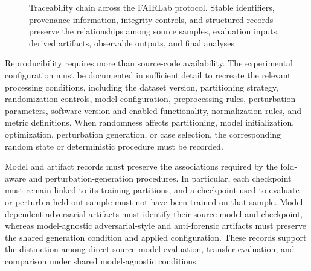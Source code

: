 \begin{figure}[H]
{%
}
\caption[Traceability chain across the FAIRLab protocol]{Traceability chain
across the FAIRLab protocol. Stable identifiers, provenance information,
integrity controls, and structured records preserve the relationships among
source samples, evaluation inputs, derived artifacts, observable outputs, and
final analyses}
\label{fig:methodology-traceability-chain}
\end{figure}

Reproducibility requires more than source-code availability. The experimental
configuration must be documented in sufficient detail to recreate the relevant
processing conditions, including the dataset version, partitioning strategy,
randomization controls, model configuration, preprocessing rules, perturbation
parameters, software version and enabled functionality, normalization rules,
and metric definitions. When randomness affects partitioning, model
initialization, optimization, perturbation generation, or case selection, the
corresponding random state or deterministic procedure must be recorded.

Model and artifact records must preserve the associations required by the
fold-aware and perturbation-generation procedures. In particular, each
checkpoint must remain linked to its training partitions, and a checkpoint
used to evaluate or perturb a held-out sample must not have been trained on
that sample. Model-dependent adversarial artifacts must identify their source
model and checkpoint, whereas model-agnostic adversarial-style and
anti-forensic artifacts must preserve the shared generation condition and
applied configuration. These records support the distinction among direct
source-model evaluation, transfer evaluation, and comparison under shared
model-agnostic conditions.

